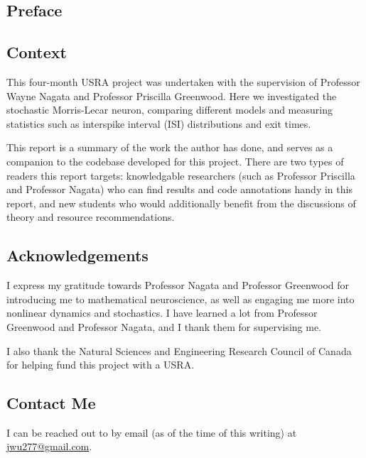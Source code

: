 \documentclass[letterpaper,12pt]{article}
\numberwithin{table}{section}
\numberwithin{figure}{section}
\numberwithin{equation}{section}
\begin{document}
\begin{flushleft}


    \section{Preface}

    \subsection{Context}

    This four-month USRA project was undertaken with the supervision of Professor Wayne Nagata and Professor Priscilla Greenwood. Here we investigated the stochastic Morris-Lecar neuron, comparing different models and measuring statistics such as interspike interval (ISI) distributions and exit times.

    This report is a summary of the work the author has done, and serves as a companion to the codebase developed for this project. There are two types of readers this report targets: knowledgable researchers (such as Professor Priscilla and Professor Nagata) who can find results and code annotations handy in this report, and new students who would additionally benefit from the discussions of theory and resource recommendations.

    \subsection{Acknowledgements}

    I express my gratitude towards Professor Nagata and Professor Greenwood for introducing me to mathematical neuroscience, as well as engaging me more into nonlinear dynamics and stochastics. I have learned a lot from Professor Greenwood and Professor Nagata, and I thank them for supervising me.

    I also thank the Natural Sciences and Engineering Research Council of Canada for helping fund this project with a USRA.

    \subsection{Contact Me}
    I can be reached out to by email (as of the time of this writing) at \href{mailto:jwu277@gmail.com}{jwu277@gmail.com}.


\end{flushleft}
\end{document}

